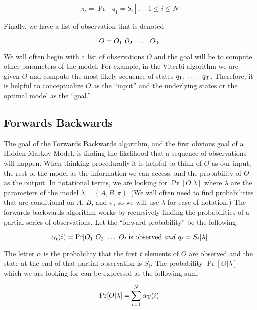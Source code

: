 \begin{equation}
  \pi_i = \Pr[q_1 = S_i], \quad 1 \leq i \leq N
\end{equation}

Finally, we have a list of observation that is denoted

\begin{equation}
  O = O_1\ O_2\ \ldots\ \ O_\Tau
\end{equation}

We will often begin with a list of observations $O$ and the goal will be
to compute other parameters of the model. For example, in the Viterbi
algorithm we are given $O$ and compute the most likely sequence of
states $q_1,\ \ldots,\ q_{\mathrm{T}}$. Therefore, it is helpful to
conceptualize $O$ as the ``input'' and the underlying states or the
optimal model as the ``goal.''

\subsection{Forwards Backwards}

The goal of the Forwards Backwards algorithm, and the first obvious goal
of a Hidden Markov Model, is finding the likelihood that a sequence of
observations will happen. When thinking procedurally it is helpful to think of $O$ as our input,
the rest of the model as the information we can access, and the
probability of $O$ as the output. In notational terms, we are looking for $\Pr[O
\vert \lambda]$ where $\lambda$ are the parameters of the model $\lambda
= (A, B, \pi)$. (We will often need to find probabilities that are
conditional on $A$, $B$, and $\pi$, so we will use $\lambda$ for ease of
notation.) The forwards-backwards algorithm works by recursively finding
the probabilities of a partial series of observations. Let the ``forward
probability'' be the following.

\begin{equation}
\alpha_t(i) = \Pr[O_1\ O_2\ \ldots\ O_t\ \textrm{is observed \emph{and}}\ q_t = S_i \vert \lambda]
\end{equation}

The letter $\alpha$ is the probability that the first $t$ elements
of $O$ are observed and the state at the end of that partial observation
is $S_i$. The probability $\Pr[O \vert \lambda]$ which we are
looking for can be expressed as the following sum.

\begin{equation}
  \Pr[O \vert \lambda] = \sum_{i=1}^N \alpha_{\mathrm{T}}(i)
\end{equation}


